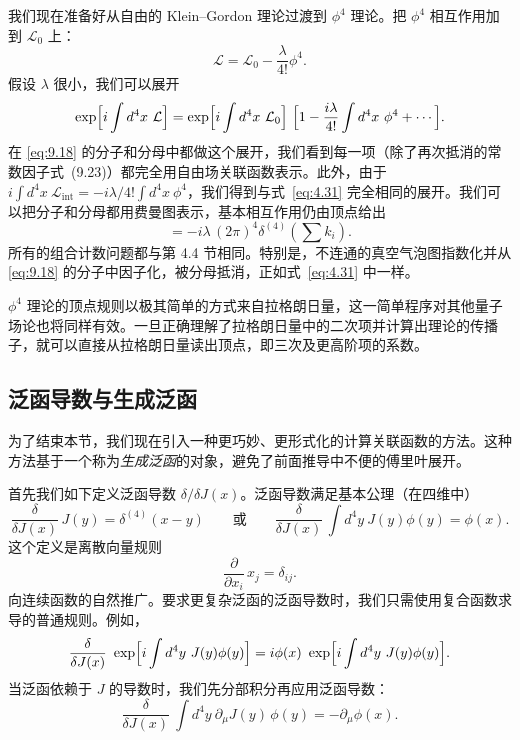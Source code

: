 我们现在准备好从自由的 Klein--Gordon 理论过渡到 $\phi^4$ 理论。把 $\phi^4$ 相互作用加到 $\mathcal{L}_0$ 上：
\begin{equation}
  \mathcal{L} = \mathcal{L}_0 - \frac{\lambda}{4!}\phi^4 .
\end{equation}
假设 $\lambda$ 很小，我们可以展开
\begin{equation}
  \exp\Bigl[ i\int d^4x\ \mathcal{L} \Bigr] = \exp\Bigl[
    i\int d^4x\ \mathcal{L}_0 \Bigr]\ \Bigl[ 1 - \frac{i\lambda}{4!}
      \int d^4x\ \phi^4 + \cdots \Bigr] .
\end{equation}
在 \eqref{eq:9.18} 的分子和分母中都做这个展开，我们看到每一项（除了再次抵消的常数因子式~(9.23)）都完全用自由场关联函数表示。此外，由于 $i\int d^4x\ \mathcal{L}_{\mathrm{int}} = -i\lambda/4!\int d^4x\ \phi^4$，我们得到与式~\eqref{eq:4.31} 完全相同的展开。我们可以把分子和分母都用费曼图表示，基本相互作用仍由顶点给出
\begin{equation}
  = -i\lambda\,(2\pi)^4\delta^{(4)}(\textstyle\sum k_i) .
  \label{eq:9.30}
\end{equation}
所有的组合计数问题都与第 4.4 节相同。特别是，不连通的真空气泡图指数化并从 \eqref{eq:9.18} 的分子中因子化，被分母抵消，正如式~\eqref{eq:4.31} 中一样。

$\phi^4$ 理论的顶点规则以极其简单的方式来自拉格朗日量，这一简单程序对其他量子场论也将同样有效。一旦正确理解了拉格朗日量中的二次项并计算出理论的传播子，就可以直接从拉格朗日量读出顶点，即三次及更高阶项的系数。

\subsection{泛函导数与生成泛函}

为了结束本节，我们现在引入一种更巧妙、更形式化的计算关联函数的方法。这种方法基于一个称为\emph{生成泛函}的对象，避免了前面推导中不便的傅里叶展开。

首先我们如下定义泛函导数 $\delta/\delta J(x)$。泛函导数满足基本公理（在四维中）
\begin{equation}
  \frac{\delta}{\delta J(x)}\,J(y) = \delta^{(4)}(x-y)
  \qquad\text{或}\qquad
  \frac{\delta}{\delta J(x)}\,\int d^4y\ J(y)\phi(y) = \phi(x) .
  \label{eq:9.31}
\end{equation}
这个定义是离散向量规则
\begin{equation}
  \frac{\partial}{\partial x_i}\,x_j = \delta_{ij} .
\end{equation}
向连续函数的自然推广。要求更复杂泛函的泛函导数时，我们只需使用复合函数求导的普通规则。例如，
\begin{equation}
  \frac{\delta}{\delta J(x)}\ \exp\Bigl[ i\int d^4y\ J(y)\phi(y) \Bigr]
  = i\phi(x)\ \exp\Bigl[ i\int d^4y\ J(y)\phi(y) \Bigr] .
  \label{eq:9.32}
\end{equation}
当泛函依赖于 $J$ 的导数时，我们先分部积分再应用泛函导数：
\begin{equation}
  \frac{\delta}{\delta J(x)}\ \int d^4y\ \partial_\mu J(y)\,\phi(y)
  = -\partial_\mu\phi(x) .
  \label{eq:9.33}
\end{equation}

